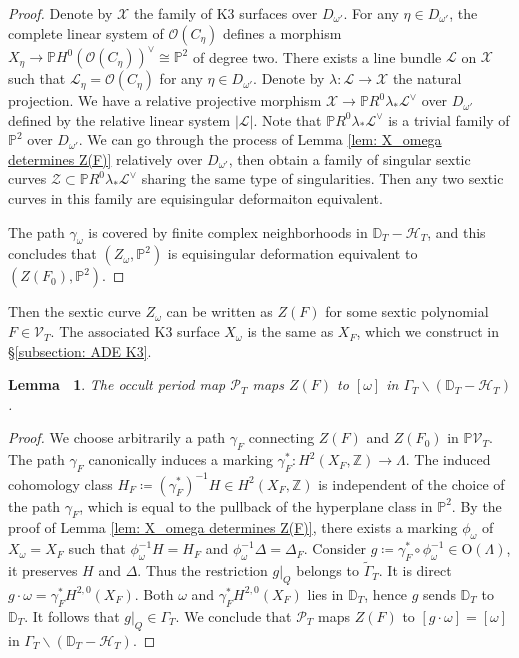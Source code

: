 \documentclass[12pt,reqno,a4paper]{amsart}
\newtheorem{lem}[thm]{Lemma~}
\theoremstyle{remark}
\theoremstyle{definition}
\begin{document}
\begin{proof}
    Denote by $\mathcal{X}$ the family of K3 surfaces over $D_{\omega'}$. 
    For any $\eta\in D_{\omega'}$, the complete linear system of $\mathcal{O}(C_\eta)$ defines a morphism $X_\eta\to \mathbb{P} H^0(\mathcal{O}(C_\eta))^\vee\cong\mathbb{P}^2$ of degree two.
    There exists a line bundle $\mathcal{L}$ on $\mathcal{X}$ such that $\mathcal{L}_\eta=\mathcal{O}(C_\eta)$ for any $\eta\in D_{\omega'}$.
    Denote by $\lambda\colon \mathcal{L}\to\mathcal{X}$ the natural projection.
    We have a relative projective morphism $\mathcal{X}\to \mathbb{P} R^0\lambda_*\mathcal{L}^\vee$ over $D_{\omega'}$ defined by the relative linear system $|\mathcal{L}|$.
    Note that $\mathbb{P} R^0\lambda_*\mathcal{L}^\vee$ is a trivial family of $\mathbb{P}^2$ over $D_{\omega'}$.
    We can go through the process of Lemma \ref{lem: X_omega determines Z(F)} relatively over $D_{\omega'}$, then obtain a family of singular sextic curves $\mathcal{Z}\subset \mathbb{P} R^0\lambda_*\mathcal{L}^\vee$ sharing the same type of singularities.
    Then any two sextic curves in this family are equisingular deformaiton equivalent.

    The path $\gamma_\omega$ is covered by finite complex neighborhoods in $\mathbb{D}_T-\mathcal{H}_T$, and this concludes that $(Z_\omega,\mathbb{P}^2)$ is equisingular deformation equivalent to $(Z(F_0),\mathbb{P}^2)$.
\end{proof}
Then the sextic curve $Z_\omega$ can be written as $Z(F)$ for some sextic polynomial $F\in\mathcal{V}_T$.
The associated K3 surface $X_\omega$ is the same as $X_F$, which we construct in \S \ref{subsection: ADE K3}.

\begin{lem}
\label{lem: Prd_T coincides with global period map}
    The occult period map $\mathscr{P}_T$ maps $Z(F)$ to $[\omega]$ in $\Gamma_T\backslash (\mathbb{D}_T-\mathcal{H}_T)$.
\end{lem}
\begin{proof}
    We choose arbitrarily a path $\gamma_F$ connecting $Z(F)$ and $Z(F_0)$ in $\mathbb{P}\mathcal{V}_T$. 
    The path $\gamma_F$ canonically induces a marking $\gamma_F^*\colon H^2(X_F,\mathbb{Z})\to\Lambda$.
    The induced cohomology class $H_F\coloneqq (\gamma_F^*)^{-1} H\in H^2(X_F,\mathbb{Z})$ is independent of the choice of the path $\gamma_F$, which is equal to the pullback of the hyperplane class in $\mathbb{P}^2$.
    By the proof of Lemma \ref{lem: X_omega determines Z(F)}, there exists a marking $\phi_\omega$ of $X_\omega=X_F$ such that $\phi_\omega^{-1} H = H_F$ and $\phi_\omega^{-1} \Delta = \Delta_F$.
    Consider $g\coloneqq \gamma_F^*\circ \phi_\omega^{-1}\in \mathrm{O}(\Lambda)$, it preserves $H$ and $\Delta$. Thus the restriction $g|_Q$ belongs to $\widetilde{\Gamma}_T$.
            It is direct $g\cdot\omega = \gamma_F^* H^{2,0}(X_F)$. 
    Both $\omega$ and $\gamma_F^* H^{2,0}(X_F)$ lies in $\mathbb{D}_T$, hence $g$ sends $\mathbb{D}_T$ to $\mathbb{D}_T$. It follows that $g|_Q\in \Gamma_T$. We conclude that $\mathscr{P}_T$ maps $Z(F)$ to $[g\cdot\omega]=[\omega]$ in $\Gamma_T\backslash (\mathbb{D}_T-\mathcal{H}_T)$.
\end{proof}
\end{document}
